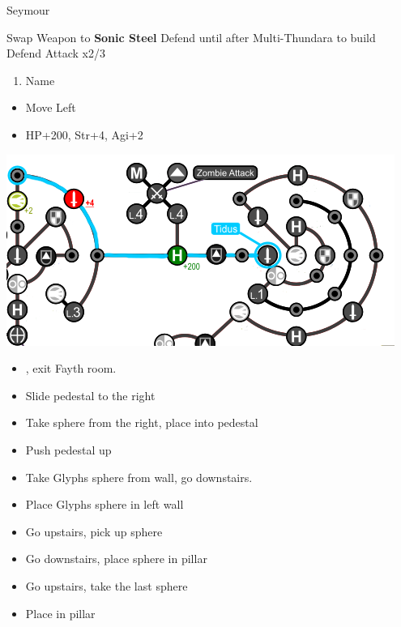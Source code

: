 \begin{battle}[6000]{Seymour}
\begin{itemize}
	\tidusf Swap Weapon to \textbf{Sonic Steel}
	\tidusf Defend until after Multi-Thundara to build \rikku\ \od
	\rikkuf Defend
	\tidusf Attack x2/3
\end{itemize}
\end{battle}
\begin{enumerate}[resume]
	\item Name \shiva
\end{enumerate}
\begin{spheregrid}
\begin{itemize}
	\tidusf
	\begin{itemize}
		\item Move Left
		\item HP+200, Str+4, Agi+2
	\end{itemize}
	\includegraphics[width=.8\columnwidth]{graphics/Tidus_Post_Seymour}
\end{itemize}
\end{spheregrid}
\begin{trial}
\begin{itemize}
	\item \save, exit Fayth room.
	\item Slide pedestal to the right
	\item Take sphere from the right, place into pedestal
	\item Push pedestal up
	\item Take Glyphs sphere from wall, go downstairs.
	\item Place Glyphs sphere in left wall
	\item Go upstairs, pick up sphere
	\item Go downstairs, place sphere in pillar
	\item Go upstairs, take the last sphere
	\item Place in pillar
\end{itemize}
\end{trial}
